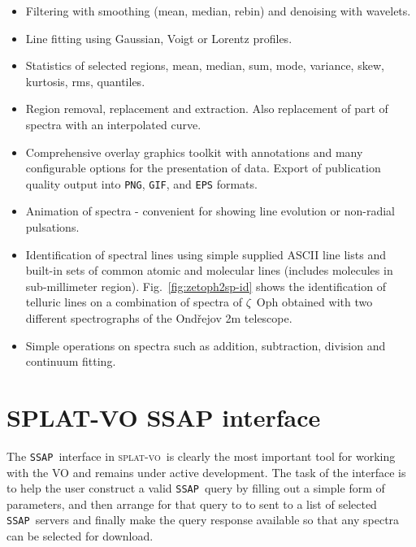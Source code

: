\documentclass[final,authoryear,5p,times,twocolumn]{elsarticle}
\newcommand{\ssap}{\texttt{SSAP}}
\newcommand{\splatvo}{\textsc{splat-vo}}
\begin{document}
\begin{itemize}
\item Filtering with smoothing (mean, median, rebin) and denoising with wavelets.

\item Line fitting using Gaussian, Voigt or Lorentz profiles.

\item Statistics of selected regions, mean, median, sum, mode, variance, skew,
      kurtosis, rms, quantiles.

\item Region removal, replacement and extraction. Also replacement of part of
 spectra with an interpolated curve.

\item Comprehensive overlay graphics toolkit with annotations and many
  configurable options for the presentation of data. Export of publication quality
  output into \texttt{PNG}, \texttt{GIF}, and \texttt{EPS} formats.

\item Animation of spectra - convenient for showing line evolution or
  non-radial pulsations.

\item Identification of spectral lines using simple supplied ASCII line lists
  and built-in sets of common atomic and molecular lines (includes molecules in
  sub-millimeter region). Fig.~\ref{fig:zetoph2sp-id} shows the identification
  of telluric lines on a combination of spectra of $\zeta$~Oph obtained with
  two different spectrographs of the Ond\v{r}ejov 2m telescope.

\item Simple operations on spectra such as addition, subtraction, division and
  continuum fitting.

\end{itemize}


\section{SPLAT-VO SSAP interface}

The \ssap\ interface in \splatvo\ is clearly the most important tool for working
with the VO and remains under active development. The task of the interface is
to help the user construct a valid \ssap\ query by filling out a simple form of
parameters, and then arrange for that query to to sent to a list of selected
\ssap\ servers and finally make the query response available so that any spectra
can be selected for download.
\end{document}
